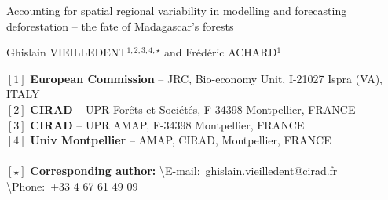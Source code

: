 \begin{center}
  \LARGE{Accounting for spatial regional variability in modelling and forecasting deforestation -- the fate of Madagascar's forests}
\end{center}

\vspace{1cm}

\begin{center}
  \large{Ghislain VIEILLEDENT$^{1,2,3,4,\star}$ and Frédéric ACHARD$^{1}$}
\end{center}

\vspace{1cm}

{\small
  \begin{flushleft}  
    $[1]$ \textbf{European Commission} -- JRC, Bio-economy Unit, I-21027 Ispra (VA), ITALY\\
    $[2]$ \textbf{CIRAD} -- UPR Forêts et Sociétés, F-34398 Montpellier, FRANCE\\
    $[3]$ \textbf{CIRAD} -- UPR AMAP, F-34398 Montpellier, FRANCE\\
    $[4]$ \textbf{Univ Montpellier} -- AMAP, CIRAD, Montpellier, FRANCE\\
    ~\\
    $[\star]$ \textbf{Corresponding author:}
    \textbackslash{E-mail}:~ghislain.vieilledent@cirad.fr
    \textbackslash{Phone}:~+33 4 67 61 49 09\\
  \end{flushleft}}
\newpage